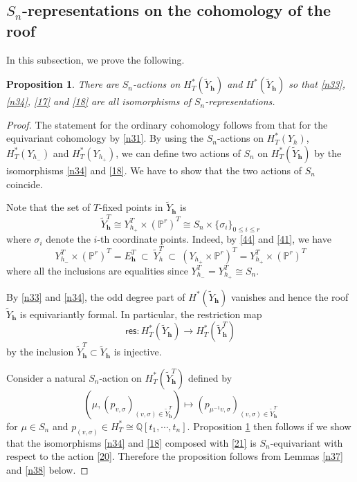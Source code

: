 \documentclass[11pt]{article}
\newtheorem{proposition}[theo]{Proposition}
\theoremstyle{definition}
\numberwithin{equation}{section}
\numberwithin{equation}{section}
\newcommand{\Q}{\mathbb{Q}}
\newcommand{\PP}{\mathbb{P}}
\newcommand\tY{{\widetilde{Y}}}
\newcommand\lra{\longrightarrow }
\newcommand\beq{\begin{equation}}
\newcommand\eeq{\end{equation}}
\newcommand\res{\mathsf{res}}
\newcommand\bh{\mathbf{h}}
\begin{document}
\subsection{\texorpdfstring{$S_n$}{Sn}-representations on the cohomology of the roof}
In this subsection, we prove the following.

\begin{proposition}\label{n35}
There are $S_n$-actions on $H^*_T(\tY_\bh)$ and $H^*(\tY_\bh)$ so that \eqref{n33}, \eqref{n34}, \eqref{17} and \eqref{18} are all isomorphisms of $S_n$-representations. 
\end{proposition}


\begin{proof} 
The statement for the ordinary cohomology follows from that for the equivariant cohomology by \eqref{n31}.  
By using the $S_n$-actions on $H^*_T(Y_h)$, $H^*_T(Y_{h_-})$ and $H^*_T(Y_{h_+})$, we can define two actions of $S_n$ on $H^*_T(\tY_\bh)$ by the isomorphisms \eqref{n34} and \eqref{18}. 
We have to show that the two actions of $S_n$ coincide. 

Note that the set of $T$-fixed points in $\tY_\bh$ is
		\beq \label{26} \tY_{\bh}^T \cong Y_{h_+}^T\times (\PP^r)^T \cong S_n\times \{\sigma_i\}_{0\leq i\leq r}\eeq
		where $\sigma_i$ denote the $i$-th coordinate points.
		Indeed, by \eqref{44} and \eqref{41}, we have
		\[Y_{h_-}^T\times (\PP^r)^T=E_\bh^T~\subset~ \tY_h^T ~\subset ~(Y_{h_+}\times \PP^r)^T=Y_{h_+}^T\times (\PP^{r})^T\]
		where all the inclusions are equalities since $Y_{h_-}^T=Y_{h_+}^T\cong S_n$.
		
By \eqref{n33} and \eqref{n34},  the odd degree part of $H^*(\tY_{\bh})$ vanishes and hence the roof $\tY_\bh$ is equivariantly formal. In particular, the restriction map
		\beq \label{21} \res: H^*_T(\tY_{\bh})\lra H^*_T(\tY_{\bh}^T)\eeq
by the inclusion $\tY_\bh^T\subset \tY_\bh$ is injective. 

					
		Consider a natural $S_n$-action on $H^*_T(\tY_{\bh}^T)$ defined by
		\beq \label{20} (\mu,(p_{v,\sigma})_{(v,\sigma)\in \tY_{\bh}^T})\mapsto  (p_{\mu^{-1}v,\sigma})_{(v,\sigma)\in \tY_{\bh}^T}\eeq
		for $\mu\in S_n$ and $p_{(v,\sigma)}\in H^*_T\cong \Q[t_1,\cdots, t_n]$.
Proposition \ref{n35} then follows if we show that the isomorphisms \eqref{n34} and \eqref{18} composed with \eqref{21} is $S_n$-equivariant with respect to the action \eqref{20}.  
Therefore the proposition follows from Lemmas \ref{n37} and \ref{n38} below. 
\end{proof}
\end{document}
